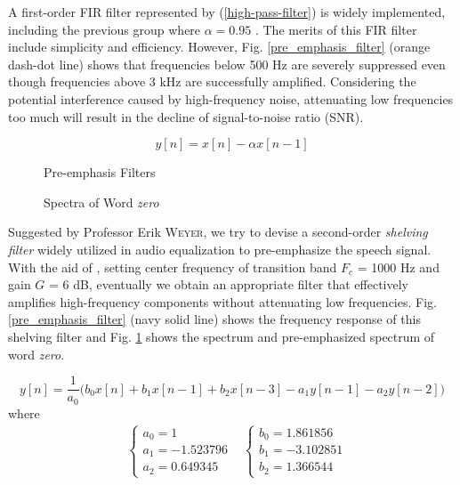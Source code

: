 A first-order FIR filter represented by (\ref{high-pass-filter}) is widely implemented, including the previous group where $\alpha = 0.95$ \cite{EVW-report}. The merits of this FIR filter include simplicity and efficiency. However, Fig. \ref{pre_emphasis_filter} (\textcolor{orange_matlab}{orange dash-dot line}) shows that frequencies below 500 Hz are severely suppressed even though frequencies above 3 kHz are successfully amplified. Considering the potential interference caused by high-frequency noise, attenuating low frequencies too much will result in the decline of signal-to-noise ratio (SNR).

\begin{equation}
\label{high-pass-filter}
y[n] = x[n] - \alpha x[n-1]
\end{equation}

\begin{figure}[H]
\begin{minipage}[t]{0.5\linewidth}
\centering
{}
\caption{Pre-emphasis Filters}
\label{pre_emphasis_filter}
\end{minipage}
\begin{minipage}[t]{0.5\linewidth}
\centering
{}
\caption{Spectra of Word \textit{zero}}
\label{zero_fft}
\end{minipage}
\end{figure}

Suggested by Professor Erik \textsc{Weyer}, we try to devise a second-order \textit{shelving filter} widely utilized in audio equalization to pre-emphasize the speech signal. With the aid of \cite{DAFX_book}, setting center frequency of transition band $F_c$ = 1000 Hz and gain $G$ = 6 dB, eventually we obtain an appropriate filter that effectively amplifies high-frequency components without attenuating low frequencies. Fig. \ref{pre_emphasis_filter} (\textcolor{navy_matlab}{navy solid line}) shows the frequency response of this shelving filter and Fig. \ref{zero_fft} shows the spectrum and pre-emphasized spectrum of word \textit{zero}.

\begin{equation}
\label{shelving-filter}
y[n] = \frac{1}{a_0} \Big( b_0 x[n] + b_1 x[n-1] + b_2 x[n-3] - a_1 y[n-1] - a_2 y[n-2] \Big)
\end{equation}
where
\begin{align}
\label{shleving-coef}
&\begin{cases}
a_0 = 1\\
a_1 = -1.523796\\
a_2 = 0.649345
\end{cases}
&\begin{cases}
b_0 = 1.861856\\
b_1 = -3.102851\\
b_2 = 1.366544
\end{cases}
\end{align}

